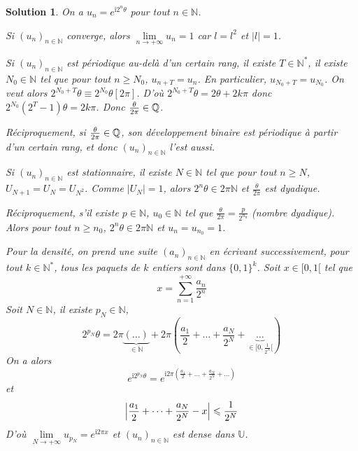 \documentclass[12pt]{article}
\newtheorem{solution}{Solution}[section]
\theoremstyle{remark}
\newcommand{\N}{\mathbb{N}} \newcommand{\Z}{\mathbb{Z}}
\newcommand{\U}{\mathbb{U}} \newcommand{\E}{\mathbb{E}}
\renewcommand{\i}{\mathrm{i}}
\numberwithin{equation}{section}
\begin{document}
\begin{solution}
	On a $u_{n}=e^{\i 2^{n}\theta}$ pour tout $n\in\N$.

	Si $(u_{n})_{n\in\N}$ converge, alors $\lim\limits_{n\to+\infty}u_{n}=1$ car $l=l^{2}$ et $\vert l\vert=1$.

	Si $(u_{n})_{n\in\N}$ est périodique au-delà d'un certain rang, il existe $T\in\N^{*}$, il existe $N_{0}\in\N$ tel que pour tout $n\geqslant N_{0}$, $u_{n+T}=u_{n}$. En particulier, $u_{N_{0}+T}=u_{N_{0}}$. On veut alors $2^{N_{0}+T}\theta\equiv 2^{N_{0}}\theta[2\pi]$. D'où $2^{N_{0}+T}\theta=2\theta+2k\pi$ donc $2^{N_{0}}(2^{T}-1)\theta=2k\pi$. Donc $\frac{\theta}{2\pi}\in\mathbb{Q}$.

	Réciproquement, si $\frac{\theta}{2\pi}\in\mathbb{Q}$, son développement binaire est périodique à partir d'un certain rang, et donc $(u_{n})_{n\in\N}$ l'est aussi.

	Si $(u_{n})_{n\in\N}$ est stationnaire, il existe $N\in\N$ tel que pour tout $n\geqslant N$, $U_{N+1}=U_{N}=U_{N^{2}}$. Comme $\vert U_{N}\vert=1$, alors $2^{n}\theta\in 2\pi\N$ et $\frac{\theta}{2\pi}$ est dyadique. 

	Réciproquement, s'il existe $p\in\N$, $u_{0}\in\N$ tel que $\frac{\theta}{2\pi}=\frac{p}{2^{n_{0}}}$ (nombre dyadique). Alors pour tout $n\geqslant n_{0}$, $2^{n}\theta\in 2\pi\N$ et $u_{n}=u_{n_{0}}=1$.

	Pour la densité, on prend une suite $(a_{n})_{n\in\N}$ en écrivant successivement, pour tout $k\in\N^{*}$, tous les paquets de $k$ entiers sont dans $\{0,1\}^{k}$. Soit $x\in[0,1[$ tel que 
	$$x=\sum_{n=1}^{+\infty}\frac{a_{n}}{2^{n}}$$
	Soit $N\in\N$, il existe $p_{N}\in\N$, 
	$$2^{p_{N}}\theta=2\pi\underbrace{(\dots)}_{\in\N}+2\pi(\frac{a_{1}}{2}+\dots+\frac{a_{N}}{2^{N}}+\underbrace{\dots}_{\in[0,\frac{1}{2^{N}}[})$$
	On a alors 
	$$e^{\i2^{p_{N}}\theta}=e^{\i2\pi(\frac{a_{1}}{2}+\dots+\frac{a_{N}}{2^{N}}+\dots)}$$
	et 
	$$\Bigl\vert\frac{a_{1}}{2}+\dots+\frac{a_{N}}{2^{N}}-x\Bigr\vert\leqslant\frac{1}{2^{N}}$$
	D'où $\lim\limits_{N\to+\infty}u_{p_{N}}=e^{\i2\pi x}$ et $(u_{n})_{n\in\N}$ est dense dans $\U$.
\end{solution}
\end{document}
